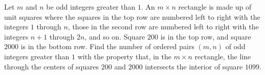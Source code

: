 Let $m$ and $n$ be odd integers greater than $1.$ An $m\times n$ rectangle is made up of unit squares where the squares in the top row are numbered left to right with the integers $1$ through $n$, those in the second row are numbered left to right with the integers $n + 1$ through $2n$, and so on. Square $200$ is in the top row, and square $2000$ is in the bottom row. Find the number of ordered pairs $(m,n)$ of odd integers greater than $1$ with the property that, in the $m\times n$ rectangle, the line through the centers of squares $200$ and $2000$ intersects the interior of square $1099.$